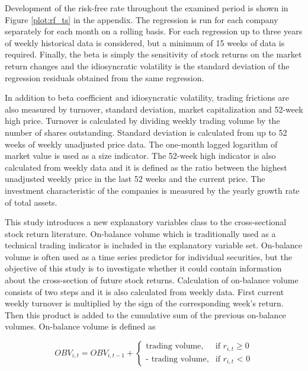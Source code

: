 \documentclass[12pt]{article}
\begin{document}
Development of the risk-free rate throughout the examined period is shown in Figure \ref{plot:rf_ts} in the appendix. The regression is run for each company separately for each month on a rolling basis. For each regression up to three years of weekly historical data is considered, but a minimum of 15 weeks of data is required. Finally, the beta is simply the sensitivity of stock returns on the market return changes and the idiosyncratic volatility is the standard deviation of the regression residuals obtained from the same regression. \par

In addition to beta coefficient and idiosyncratic volatility, trading frictions are also measured by turnover, standard deviation, market capitalization and 52-week high price. Turnover is calculated by dividing weekly trading volume by the number of shares outstanding. Standard deviation is calculated from up to 52 weeks of weekly unadjusted price data. The one-month lagged logarithm of market value is used as a size indicator. The 52-week high indicator is also calculated from weekly data and it is defined as the ratio between the highest unadjusted weekly price in the last 52 weeks and the current price. The investment characteristic of the companies is measured by the yearly growth rate of total assets. \par

This study introduces a new explanatory variables class to the cross-sectional stock return literature. On-balance volume which is traditionally used as a technical trading indicator is included in the explanatory variable set. On-balance volume is often used as a time series predictor for individual securities, but the objective of this study is to investigate whether it could contain information about the cross-section of future stock returns. Calculation of on-balance volume consists of two steps and it is also calculated from weekly data. First current weekly turnover is multiplied by the sign of the corresponding week's return. Then this product is added to the cumulative sum of the previous on-balance volumes. On-balance volume is defined as \par

\begin{equation}
\label{eq:OBV}
OBV_{i, t} = OBV_{i, t-1} + 
\begin{cases}
    \text{trading volume}, 	& \text{if $r_{i, t}$} \geq \text{0}\\
    \text{- trading volume},	& \text{if $r_{i, t}$ < 0}
\end{cases}
\end{equation}
\end{document}

